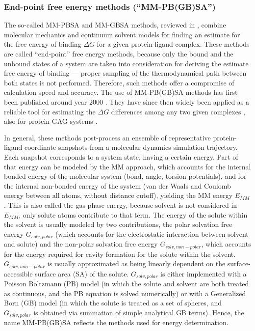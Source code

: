 \subsubsection{End-point free energy methods (\enquote{MM-PB(GB)SA})}
\label{methods:mmpbsa_mmgbsa}

The so-called MM-PBSA and MM-GBSA methods, reviewed in
\cite{schlick_innovationsdynamics_mmpbsa_2012}, combine molecular mechanics and
continuum solvent models for finding an estimate for the free energy of binding
$\Delta G$ for a given protein-ligand complex. These methods are called
\enquote{end-point} free energy methods, because only the bound and the unbound
states of a system are taken into consideration for deriving the estimate free
energy of binding --- proper sampling of the thermodynamical path between both
states is not performed. Therefore, such methods offer a compromise of
calculation speed and accuracy. The use of MM-PB(GB)SA methods has first been
published around year 2000 \cite{kollmann_massova_mmpbsa_2000}. They have since
then widely been applied as a reliable tool for estimating the $\Delta G$
differences among any two given complexes \cite{mmgbsa_application_2010,
mmpbsa_hiv_2011}, also for protein-GAG systems \cite{mancera_mmpbsa_gags_2009}.

In general, these methods post-process an ensemble of representative
protein-ligand coordinate snapshots from a molecular dynamics simulation
trajectory. Each snapshot corresponds to a system state, having a certain
energy. Part of that energy can be modeled by the MM approach, which accounts
for the internal bonded energy of the molecular system (bond, angle, torsion
potentials), and for the internal non-bonded energy of the system (van der Waals
and Coulomb energy between all atoms, without distance cutoff), yielding the MM
energy $E_{MM}$. This is also called the gas-phase energy, because solvent is
not considered in $E_{MM}$, only solute atoms contribute to that term. The
energy of the solute within the solvent is usually modeled by two contributions,
the polar solvation free energy $G_{solv,polar}$ (which accounts for the
electrostatic interaction between solvent and solute) and the non-polar
solvation free energy $G_{solv,non-polar}$, which accounts for the energy
required for cavity formation for the solute within the solvent.
$G_{solv,non-polar}$ is usually approximated as being linearly dependent on the
surface-accessible surface area (SA) of the solute. $G_{solv,polar}$ is either
implemented with a Poisson Boltzmann (PB) model (in which the solute and solvent
are both treated as continuous, and the PB equation is solved numerically) or
with a Generalized Born (GB) model (in which the solute is treated as a set of
spheres, and $G_{solv,polar}$ is obtained via summation of simple analytical GB
terms). Hence, the name MM-PB(GB)SA reflects the methods used for energy
determination.

